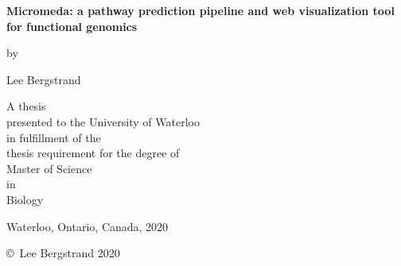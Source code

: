 \pagestyle{empty}

\begin{titlepage}
        \begin{center}
        \vspace*{1.0cm}

        \Huge
        {\bf Micromeda: a pathway prediction pipeline and web visualization tool for functional genomics}

        \vspace*{1.0cm}

        \normalsize
        by \\

        \vspace*{1.0cm}

        \Large
        Lee Bergstrand \\

        \vspace*{3.0cm}

        \normalsize
        A thesis \\
        presented to the University of Waterloo \\ 
        in fulfillment of the \\
        thesis requirement for the degree of \\
        Master of Science \\
        in \\
        Biology \\

        \vspace*{2.0cm}

        Waterloo, Ontario, Canada, 2020 \\

        \vspace*{1.0cm}

        \copyright\ Lee Bergstrand 2020 \\
        \end{center}
\end{titlepage}

\pagestyle{plain}
\setcounter{page}{2}

